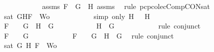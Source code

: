 \begin{isabellebody}
\ \ \ \ \ \ \ \ \ \ \isamarkupfalse%
\ assms{\isacharparenleft}{}{\isacharparenright}\ {\isacartoucheopen}F\ {\isacharequal}\ \isactrlbold {\isasymnot}{\isacharparenleft}G\ \isactrlbold {\isasymrightarrow}\ H{}{\isacharparenright}{\isacartoucheclose}\ assms{\isacharparenleft}{}{\isacharcomma}{}{\isacharcomma}{}{\isacharparenright}\ \isamarkupfalse%
\ {\isacharparenleft}rule\ pcp{\isacharunderscore}colecComp{\isacharunderscore}CON{\isacharunderscore}sat{}{\isacharparenright}\isanewline
\ \ \ \ \ \ \ \ \isamarkupfalse%
\ {\isachardoublequoteopen}sat\ {\isacharparenleft}{\isacharbraceleft}G{\isacharcomma}H{\isacharcomma}F{\isacharbraceright}\ {\isasymunion}\ Wo{\isacharparenright}{\isachardoublequoteclose}\isanewline
\ \ \ \ \ \ \ \ \ \ \isamarkupfalse%
\ {\isacharparenleft}simp\ only{\isacharcolon}\ {\isacartoucheopen}H\ {\isacharequal}\ \isactrlbold {\isasymnot}\ H{}{\isacartoucheclose}{\isacharparenright}\isanewline
\ \ \ \ \ \ \isamarkupfalse%
\isanewline
\ \ \ \ \ \ \ \ \isamarkupfalse%
\ {\isachardoublequoteopen}F\ {\isacharequal}\ \isactrlbold {\isasymnot}\ {\isacharparenleft}\isactrlbold {\isasymnot}\ G{\isacharparenright}\ {\isasymand}\ H\ {\isacharequal}\ G{\isachardoublequoteclose}\isanewline
\ \ \ \ \ \ \ \ \isamarkupfalse%
\ \isamarkupfalse%
\ {\isachardoublequoteopen}H\ {\isacharequal}\ G{\isachardoublequoteclose}\isanewline
\ \ \ \ \ \ \ \ \ \ \isamarkupfalse%
\ {\isacharparenleft}rule\ conjunct{}{\isacharparenright}\isanewline
\ \ \ \ \ \ \ \ \isamarkupfalse%
\ {\isachardoublequoteopen}F\ {\isacharequal}\ \isactrlbold {\isasymnot}\ {\isacharparenleft}\isactrlbold {\isasymnot}\ G{\isacharparenright}{\isachardoublequoteclose}\isanewline
\ \ \ \ \ \ \ \ \ \ \isamarkupfalse%
\ {\isacartoucheopen}F\ {\isacharequal}\ \isactrlbold {\isasymnot}\ {\isacharparenleft}\isactrlbold {\isasymnot}\ G{\isacharparenright}\ {\isasymand}\ H\ {\isacharequal}\ G{\isacartoucheclose}\ \isamarkupfalse%
\ {\isacharparenleft}rule\ conjunct{}{\isacharparenright}\isanewline
\ \ \ \ \ \ \ \ \isamarkupfalse%
\ {\isachardoublequoteopen}sat\ {\isacharparenleft}{\isacharbraceleft}G{\isacharcomma}\ H{\isacharcomma}\ F{\isacharbraceright}\ {\isasymunion}\ Wo{\isacharparenright}{\isachardoublequoteclose}\isanewline
\ \ \ \ \ \ \ \ \ \ \isamarkupfalse%

\end{isabellebody}
